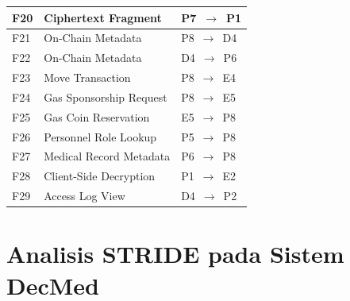 \documentclass[bahasa, 12pt, a4paper, onecolumn, oneside, final]{report}
\begin{document}
\begin{table}[!ht]
\begin{tabular}{|p{}|p{}|p{}|}
		F20         & Ciphertext Fragment          & P7~$\rightarrow$~P1   \\ \hline
		F21         & On-Chain Metadata            & P8~$\rightarrow$~D4   \\ \hline
		F22         & On-Chain Metadata            & D4~$\rightarrow$~P6   \\ \hline
		F23         & Move Transaction             & P8~$\rightarrow$~E4   \\ \hline
		F24         & Gas Sponsorship Request      & P8~$\rightarrow$~E5   \\ \hline
		F25         & Gas Coin Reservation         & E5~$\rightarrow$~P8   \\ \hline
		F26         & Personnel Role Lookup        & P5~$\rightarrow$~P8   \\ \hline
		F27         & Medical Record Metadata      & P6~$\rightarrow$~P8   \\ \hline
		F28         & Client-Side Decryption       & P1~$\rightarrow$~E2   \\ \hline
		F29         & Access Log View              & D4~$\rightarrow$~P2   \\ \hline
	\end{tabular}
\end{table}
\chapter{Analisis STRIDE pada Sistem DecMed}
\label{lampiran:analisis-stride-decmed}
\end{document}
